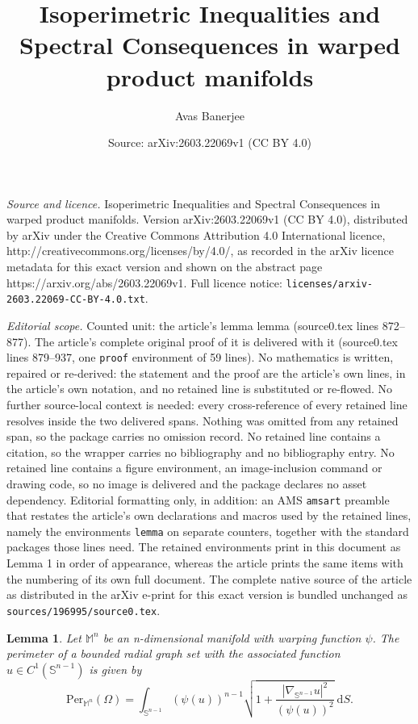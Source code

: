 \documentclass[10pt,a4paper]{amsart}
\title{Isoperimetric Inequalities and Spectral Consequences in warped product manifolds}
\author{Avas Banerjee}
\date{Source: arXiv:2603.22069v1 (CC BY 4.0)}
\newtheorem{lemma}{Lemma}
\newcommand{\m}{\mathbb{M}^n}
\newcommand{\sn}{\mathbb{S}^{n-1}}
\begin{document}
\maketitle

\noindent\emph{Source and licence.} Isoperimetric Inequalities and Spectral Consequences in warped product manifolds. Version arXiv:2603.22069v1 (CC BY 4.0), distributed by arXiv under the Creative Commons Attribution 4.0 International licence, http://creativecommons.org/licenses/by/4.0/, as recorded in the arXiv licence metadata for this exact version and shown on the abstract page https://arxiv.org/abs/2603.22069v1. Full licence notice: \texttt{licenses/arxiv-2603.22069-CC-BY-4.0.txt}.\par\smallskip

\noindent\textit{Editorial scope.} Counted unit: the article's lemma lemma (source0.tex lines 872--877). The article's complete original proof of it is delivered with it (source0.tex lines 879--937, one \texttt{proof} environment of 59 lines). No mathematics is written, repaired or re-derived: the statement and the proof are the article's own lines, in the article's own notation, and no retained line is substituted or re-flowed.  No further source-local context is needed: every cross-reference of every retained line resolves inside the two delivered spans.  Nothing was omitted from any retained span, so the package carries no omission record.  No retained line contains a citation, so the wrapper carries no bibliography and no bibliography entry.  No retained line contains a figure environment, an image-inclusion command or drawing code, so no image is delivered and the package declares no asset dependency.  Editorial formatting only, in addition: an AMS \texttt{amsart} preamble that restates the article's own declarations and macros used by the retained lines, namely the environments \texttt{lemma} on separate counters, together with the standard packages those lines need.  The retained environments print in this document as Lemma 1 in order of appearance, whereas the article prints the same items with the numbering of its own full document.  The complete native source of the article as distributed in the arXiv e-print for this exact version is bundled unchanged as \texttt{sources/196995/source0.tex}.
\begin{lemma}
    Let $\m$ be an n-dimensional manifold with warping function $\psi$. The perimeter of a bounded radial graph set with the associated function $u \in C^1(\sn)$ is given by 
    \begin{equation*}
        \mathrm{Per}_{\m}(\Omega)=\int_{\sn}(\psi(u))^{n-1}\sqrt{1+\frac{|\nabla_{\sn}u|^2}{(\psi(u))^2}}\ \mathrm{d}S.
    \end{equation*}
\end{lemma}
\end{document}
